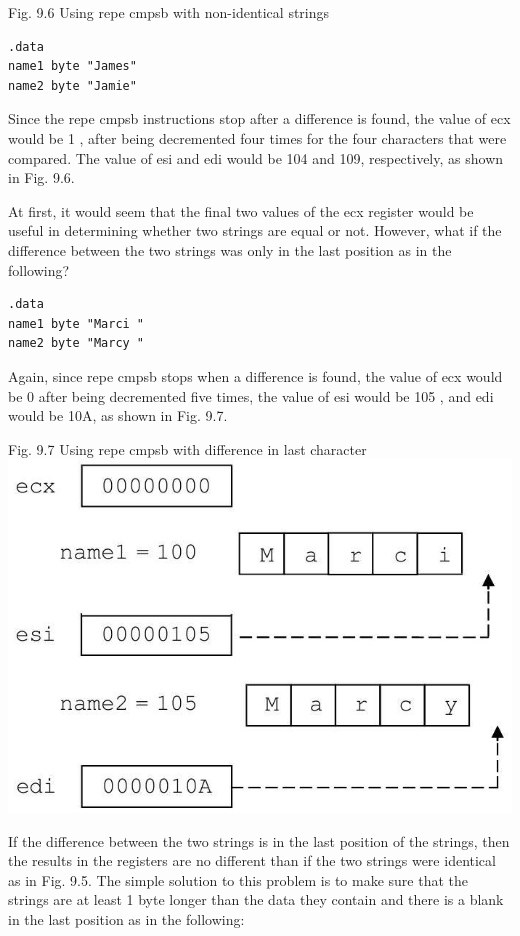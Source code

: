 \documentclass[10pt]{article}
\begin{document}
Fig. 9.6 Using repe cmpsb with non-identical strings

\begin{verbatim}
.data
name1 byte "James"
name2 byte "Jamie"
\end{verbatim}

Since the repe cmpsb instructions stop after a difference is found, the value of ecx would be 1 , after being decremented four times for the four characters that were compared. The value of esi and edi would be 104 and 109, respectively, as shown in Fig. 9.6.

At first, it would seem that the final two values of the ecx register would be useful in determining whether two strings are equal or not. However, what if the difference between the two strings was only in the last position as in the following?

\begin{verbatim}
.data
name1 byte "Marci "
name2 byte "Marcy "
\end{verbatim}

Again, since repe cmpsb stops when a difference is found, the value of ecx would be 0 after being decremented five times, the value of esi would be 105 , and edi would be 10A, as shown in Fig. 9.7.

Fig. 9.7 Using repe cmpsb with difference in last character\\
\includegraphics[max width=\textwidth, center]{2025_03_24_ebe50cc223a6fbc49eecg-211}

If the difference between the two strings is in the last position of the strings, then the results in the registers are no different than if the two strings were identical as in Fig. 9.5. The simple solution to this problem is to make sure that the strings are at least 1 byte longer than the data they contain and there is a blank in the last position as in the following:
\end{document}
